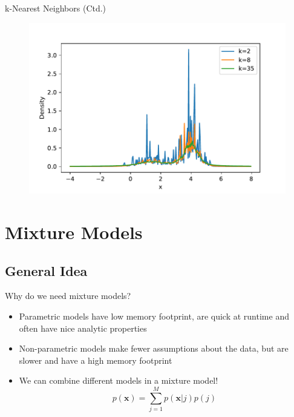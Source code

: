 \begin{frame}{k-Nearest Neighbors (Ctd.)}
	\begin{figure}
		\centering
		\includegraphics[scale=0.55]{04_density_estimation/02_img/knn}
	\end{figure}
\end{frame}


\section{Mixture Models}

\subsection{General Idea}

\begin{frame}{Why do we need mixture models?}{}
	\begin{itemize}
		\item Parametric models have low memory footprint, are quick at runtime and often have nice analytic properties
		\item Non-parametric models make fewer assumptions about the data, but are slower and have a high memory footprint
		\item We can combine different models in a mixture model!
		\begin{equation}
			p(\bm{x}) = \sum_{j=1}^M p(\bm{x}|j) p(j)
		\end{equation}
	\end{itemize}
\end{frame}


